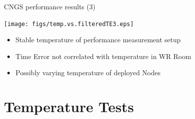 \documentclass[compress,red]{beamer}
\begin{document}
\begin{frame}{CNGS performance results (3)}

	\begin{center}
		\texttt{[image: figs/temp.vs.filteredTE3.eps]}
	
		\begin{itemize}
			\item Stable temperature of performance measurement setup
			\item Time Error not correlated with temperature in WR Room
			\item Possibly varying temperature of deployed Nodes
		\end{itemize}	
		
	\end{center}




\end{frame}

\section{Temperature Tests}
\end{document}
